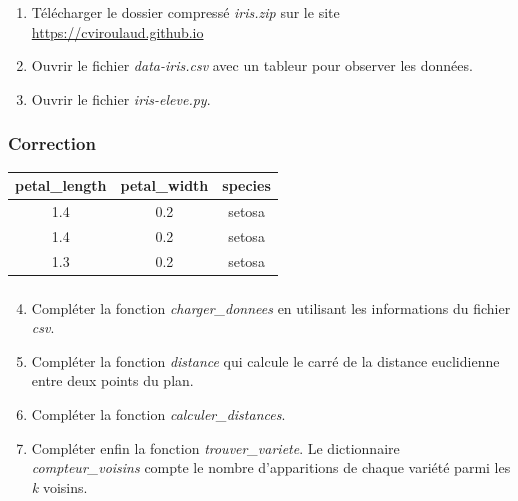 \documentclass[svgnames,11pt]{beamer}
\begin{document}
\begin{frame}
    \frametitle{}

    \begin{activite}
        \begin{enumerate}
            \item Télécharger le dossier compressé \emph{iris.zip} sur le site \url{https://cviroulaud.github.io}
            \item Ouvrir le fichier \emph{data-iris.csv} avec un tableur pour observer les données.
            \item Ouvrir le fichier \emph{iris-eleve.py}.
            
            
        \end{enumerate}
        \end{activite}

\end{frame}
\begin{frame}
    \frametitle{Correction}

    \begin{center}
        \begin{tabular}[]{|*{3}{c|}}
            \hline
            petal\_length&petal\_width&species\\
            \hline
            1.4&0.2&setosa\\
            \hline
            1.4&0.2&setosa\\
            \hline
            1.3&0.2&setosa\\
\hline
        \end{tabular}
    \end{center}
\end{frame}
\begin{frame}
    \frametitle{}
    \setcounter{compteuractivite}{2}

    \begin{activite}

        \begin{enumerate}
            \setcounter{enumi}{3}

            \item Compléter la fonction \emph{charger\_donnees} en utilisant les informations du fichier \emph{csv}.
            \item Compléter la fonction \emph{distance} qui calcule le carré de la distance euclidienne entre deux points du plan.
            \item Compléter la fonction \emph{calculer\_distances}.
            \item Compléter enfin la fonction \emph{trouver\_variete}. Le dictionnaire \emph{compteur\_voisins} compte le nombre d'apparitions de chaque variété parmi les \emph{k} voisins.
        \end{enumerate}
    \end{activite}

\end{frame}
\end{document}
